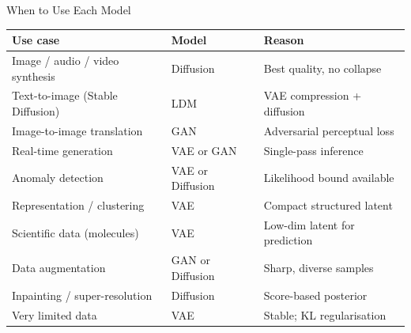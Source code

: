 \documentclass[aspectratio=169,11pt]{beamer}
\begin{document}
\begin{frame}{When to Use Each Model}
\footnotesize
\begin{center}
\renewcommand{\arraystretch}{1.0}
\begin{tabular}{p{3.8cm}p{2.1cm}p{3.8cm}}
\toprule
\textbf{Use case} & \textbf{Model} & \textbf{Reason}\\
\midrule
Image / audio / video synthesis & Diffusion & Best quality, no collapse\\
Text-to-image (Stable Diffusion) & LDM & VAE compression + diffusion\\
Image-to-image translation & GAN & Adversarial perceptual loss\\
Real-time generation & VAE or GAN & Single-pass inference\\
Anomaly detection & VAE or Diffusion & Likelihood bound available\\
Representation / clustering & VAE & Compact structured latent\\
Scientific data (molecules) & VAE & Low-dim latent for prediction\\
Data augmentation & GAN or Diffusion & Sharp, diverse samples\\
Inpainting / super-resolution & Diffusion & Score-based posterior\\
Very limited data & VAE & Stable; KL regularisation\\
\bottomrule
\end{tabular}
\end{center}
\end{frame}
\end{document}
